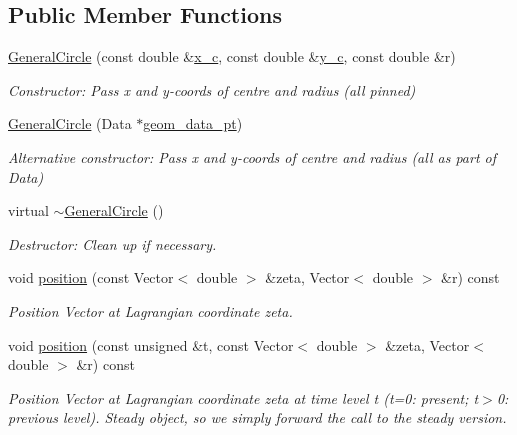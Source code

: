 \subsection*{Public Member Functions}
\begin{DoxyCompactItemize}
\item 
\hyperlink{classoomph_1_1GeneralCircle_aa4847492eeebdc2033c82734d7bcf2f2}{General\+Circle} (const double \&\hyperlink{classoomph_1_1GeneralCircle_a9c84564d8239bd8b4a2b28649638dd4a}{x\+\_\+c}, const double \&\hyperlink{classoomph_1_1GeneralCircle_afa91b6356920d73e05f81d6e7aaf0bf7}{y\+\_\+c}, const double \&r)
\begin{DoxyCompactList}\small\item\em Constructor\+: Pass x and y-\/coords of centre and radius (all pinned) \end{DoxyCompactList}\item 
\hyperlink{classoomph_1_1GeneralCircle_afdcca2cddb52a51abc693c7d7ba6b173}{General\+Circle} (Data $\ast$\hyperlink{classoomph_1_1GeneralCircle_ad5c33bb9a727a8fe28be0087f5baa9f5}{geom\+\_\+data\+\_\+pt})
\begin{DoxyCompactList}\small\item\em Alternative constructor\+: Pass x and y-\/coords of centre and radius (all as part of Data) \end{DoxyCompactList}\item 
virtual \hyperlink{classoomph_1_1GeneralCircle_a4ba230f7d22d7b116603115952ca50b0}{$\sim$\+General\+Circle} ()
\begin{DoxyCompactList}\small\item\em Destructor\+: Clean up if necessary. \end{DoxyCompactList}\item 
void \hyperlink{classoomph_1_1GeneralCircle_acc120835b4f0c69e7dce7e839db63d1d}{position} (const Vector$<$ double $>$ \&zeta, Vector$<$ double $>$ \&r) const
\begin{DoxyCompactList}\small\item\em Position Vector at Lagrangian coordinate zeta. \end{DoxyCompactList}\item 
void \hyperlink{classoomph_1_1GeneralCircle_a94f7f58a7131f80a245007ff0da73f74}{position} (const unsigned \&t, const Vector$<$ double $>$ \&zeta, Vector$<$ double $>$ \&r) const
\begin{DoxyCompactList}\small\item\em Position Vector at Lagrangian coordinate zeta at time level t (t=0\+: present; t$>$0\+: previous level). Steady object, so we simply forward the call to the steady version. \end{DoxyCompactList}\item 

\end{DoxyCompactItemize}
